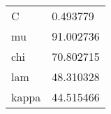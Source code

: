 \begin{tabular}{ll}
C & 0.493779\\
mu & 91.002736\\
chi & 70.802715\\
lam & 48.310328\\
kappa & 44.515466\\
\end{tabular}
